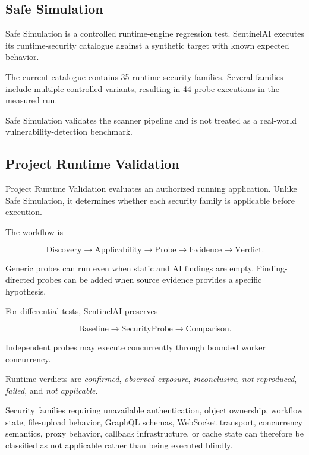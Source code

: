\documentclass[journal]{IEEEtran}
\begin{document}
\subsection{Safe Simulation}

Safe Simulation is a controlled runtime-engine regression test. SentinelAI
executes its runtime-security catalogue against a synthetic target with
known expected behavior.

The current catalogue contains 35 runtime-security families. Several
families include multiple controlled variants, resulting in 44 probe
executions in the measured run.

Safe Simulation validates the scanner pipeline and is not treated as a
real-world vulnerability-detection benchmark.

\subsection{Project Runtime Validation}

Project Runtime Validation evaluates an authorized running application.
Unlike Safe Simulation, it determines whether each security family is
applicable before execution.

The workflow is

\begin{equation}
\mathrm{Discovery}
\rightarrow
\mathrm{Applicability}
\rightarrow
\mathrm{Probe}
\rightarrow
\mathrm{Evidence}
\rightarrow
\mathrm{Verdict}.
\label{eq:runtime-flow}
\end{equation}

Generic probes can run even when static and AI findings are empty.
Finding-directed probes can be added when source evidence provides a
specific hypothesis.

For differential tests, SentinelAI preserves

\begin{equation}
\mathrm{Baseline}
\rightarrow
\mathrm{SecurityProbe}
\rightarrow
\mathrm{Comparison}.
\label{eq:baseline-flow}
\end{equation}

Independent probes may execute concurrently through bounded worker
concurrency.

Runtime verdicts are
\textit{confirmed},
\textit{observed exposure},
\textit{inconclusive},
\textit{not reproduced},
\textit{failed}, and
\textit{not applicable}.

Security families requiring unavailable authentication, object ownership,
workflow state, file-upload behavior, GraphQL schemas, WebSocket transport,
concurrency semantics, proxy behavior, callback infrastructure, or cache
state can therefore be classified as not applicable rather than being
executed blindly.
\end{document}

